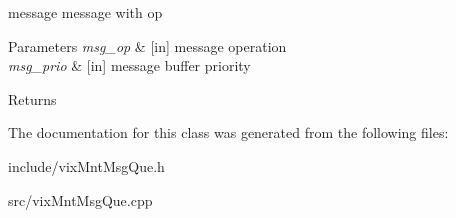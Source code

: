 message message with op 


\begin{DoxyParams}{Parameters}
{\em msg\+\_\+op} & \mbox{[}in\mbox{]} message operation \\
\hline
{\em msg\+\_\+prio} & \mbox{[}in\mbox{]} message buffer priority\\
\hline
\end{DoxyParams}
\begin{DoxyReturn}{Returns}

\end{DoxyReturn}


The documentation for this class was generated from the following files\+:\begin{DoxyCompactItemize}
\item 
include/vix\+Mnt\+Msg\+Que.\+h\item 
src/vix\+Mnt\+Msg\+Que.\+cpp\end{DoxyCompactItemize}
